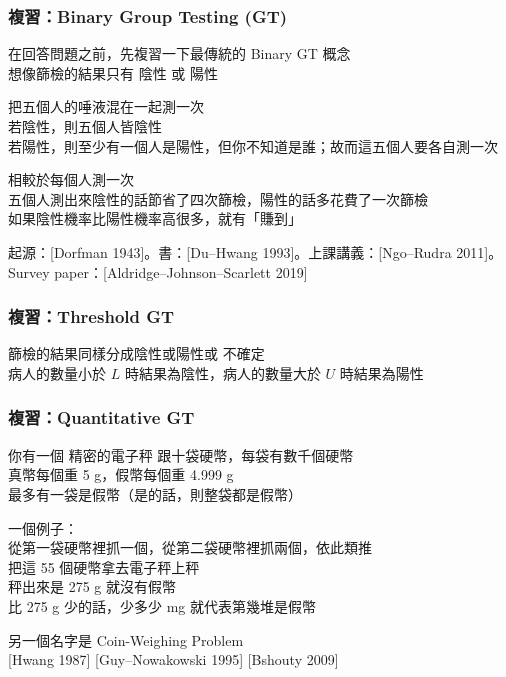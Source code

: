\documentclass[12pt,aspectratio=1610]{beamer}
\def\pp{\pause\par}
\begin{document}
\begin{frame}\frametitle{複習：Binary Group Testing (GT)}
	在回答問題之前，先複習一下最傳統的 Binary GT 概念 \\
	想像篩檢的結果只有 \alert{陰性} 或 \alert{陽性}
	\pp
	把五個人的唾液混在一起測一次 \\
	若陰性，則五個人皆陰性 \\
	若陽性，則至少有一個人是陽性，但你不知道是誰；故而這五個人要各自測一次
	\pp
	相較於每個人測一次 \\
	五個人測出來陰性的話節省了四次篩檢，陽性的話多花費了一次篩檢 \\
	如果陰性機率比陽性機率高很多️，就有「賺到」
	\par
	起源：[Dorfman 1943]。書：[Du--Hwang 1993]。上課講義：[Ngo--Rudra 2011]。 \\
	Survey paper：[Aldridge--Johnson--Scarlett 2019]
\end{frame}


\begin{frame}\frametitle{複習：Threshold GT}
	篩檢的結果同樣分成陰性或陽性或 \alert{不確定} \\
	病人的數量小於 $L$ 時結果為陰性，病人的數量大於 $U$ 時結果為陽性
	\par
	[Damaschke 2006] [Dyachkov 2013] [Cheraghchi 2013]
\end{frame}

\begin{frame}\frametitle{複習：Quantitative GT}
	你有一個 \alert{精密的電子秤} 跟十袋硬幣，每袋有數千個硬幣 \\
	真幣每個重 5 g，假幣每個重 4.999 g \\
	最多有一袋是假幣（是的話，則整袋都是假幣）
	\pp
	一個例子： \\
	從第一袋硬幣裡抓一個，從第二袋硬幣裡抓兩個，依此類推 \\
	把這 55 個硬幣拿去電子秤上秤 \\
	秤出來是 275 g 就沒有假幣 \\
	比 275 g 少的話，少多少 mg 就代表第幾堆是假幣
	\pp
	另一個名字是 Coin-Weighing Problem \\{}
	[Hwang 1987] [Guy--Nowakowski 1995] [Bshouty 2009]
\end{frame}
\end{document}

